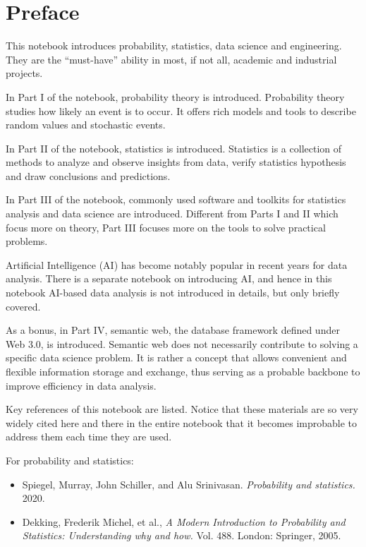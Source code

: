 \chapter*{Preface}

This notebook introduces probability, statistics, data science and engineering. They are the ``must-have'' ability in most, if not all, academic and industrial projects.

In Part I of the notebook, probability theory is introduced. Probability theory studies how likely an event is to occur. It offers rich models and tools to describe random values and stochastic events.

In Part II of the notebook, statistics is introduced. Statistics is a collection of methods to analyze and observe insights from data, verify statistics hypothesis and draw conclusions and predictions.

In Part III of the notebook, commonly used software and toolkits for statistics analysis and data science are introduced. Different from Parts I and II which focus more on theory, Part III focuses more on the tools to solve practical problems. 

Artificial Intelligence (AI) has become notably popular in recent years for data analysis. There is a separate notebook on introducing AI, and hence in this notebook AI-based data analysis is not introduced in details, but only briefly covered.

As a bonus, in Part IV, semantic web, the database framework defined under Web 3.0, is introduced. Semantic web does not necessarily contribute to solving a specific data science problem. It is rather a concept that allows convenient and flexible information storage and exchange, thus serving as a probable backbone to improve efficiency in data analysis.

Key references of this notebook are listed. Notice that these materials are so very widely cited here and there in the entire notebook that it becomes improbable to address them each time they are used.

For probability and statistics:
\begin{itemize}
  \item Spiegel, Murray, John Schiller, and Alu Srinivasan. \textit{Probability and statistics.} 2020.
  \item Dekking, Frederik Michel, et al., \textit{A Modern Introduction to Probability and Statistics: Understanding why and how.} Vol. 488. London: Springer, 2005.
\end{itemize}

